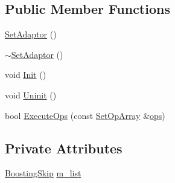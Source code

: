 \subsection*{Public Member Functions}
\begin{DoxyCompactItemize}
\item 
\hyperlink{classSetAdaptor_3_01BoostingSkip_01_4_a9fd1ac12112342458d14848413763957}{Set\-Adaptor} ()
\item 
\hyperlink{classSetAdaptor_3_01BoostingSkip_01_4_a23a8290e48f6747d719ad5adda0516cb}{$\sim$\-Set\-Adaptor} ()
\item 
void \hyperlink{classSetAdaptor_3_01BoostingSkip_01_4_ae0b507f081ce1ab004fbfdc765fb92cf}{Init} ()
\item 
void \hyperlink{classSetAdaptor_3_01BoostingSkip_01_4_a7abe76cae98acca48074a49bd5a74a72}{Uninit} ()
\item 
bool \hyperlink{classSetAdaptor_3_01BoostingSkip_01_4_ade474ad2cdce8087c77bf08686385e9e}{Execute\-Ops} (const \hyperlink{setadaptor_8h_a7af6ba4d94b446744e0e49accfb08e24}{Set\-Op\-Array} \&\hyperlink{stmskip_8cc_a91ee67dbc899b78fabcd2bfc4643d307}{ops})
\end{DoxyCompactItemize}
\subsection*{Private Attributes}
\begin{DoxyCompactItemize}
\item 
\hyperlink{classBoostingSkip}{Boosting\-Skip} \hyperlink{classSetAdaptor_3_01BoostingSkip_01_4_a87d9e950d7d00b9994a39715a1ae6941}{m\-\_\-list}
\end{DoxyCompactItemize}


